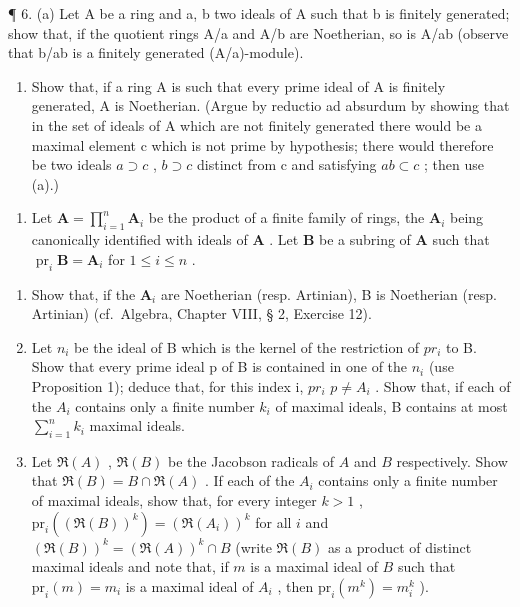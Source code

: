 ¶ 6. (a) Let A be a ring and a, b two ideals of A such that b is finitely generated; show that, if the quotient rings A/a and A/b are Noetherian, so is A/ab (observe that b/ab is a finitely generated (A/a)-module).

\begin{enumerate}
\def\labelenumi{(\alph{enumi})}
\setcounter{enumi}{1}
\tightlist
\item
  Show that, if a ring A is such that every prime ideal of A is finitely generated, A is Noetherian. (Argue by reductio ad absurdum by showing that in the set of ideals of A which are not finitely generated there would be a maximal element c which is not prime by hypothesis; there would therefore be two ideals \(a \supset c\) , \(b \supset c\) distinct from c and satisfying \(ab \subset c\) ; then use (a).)
\end{enumerate}

\begin{enumerate}
\def\labelenumi{\arabic{enumi}.}
\setcounter{enumi}{6}
\tightlist
\item
  Let \(\mathbf{A} = \prod_{i=1}^{n} \mathbf{A}_i\) be the product of a finite family of rings, the \(\mathbf{A}_i\) being canonically identified with ideals of \(\mathbf{A}\) . Let \(\mathbf{B}\) be a subring of \(\mathbf{A}\) such that \(\operatorname{pr}_i \mathbf{B} = \mathbf{A}_i\) for \(1 \leqslant i \leqslant n\) .
\end{enumerate}

\begin{enumerate}
\def\labelenumi{(\alph{enumi})}
\item
  Show that, if the \(\mathbf{A}_i\) are Noetherian (resp. Artinian), B is Noetherian (resp. Artinian) (cf.~Algebra, Chapter VIII, § 2, Exercise 12).
\item
  Let \(n_{i}\) be the ideal of B which is the kernel of the restriction of \(pr_{i}\) to B. Show that every prime ideal p of B is contained in one of the \(n_{i}\) (use Proposition 1); deduce that, for this index i, \(pr_{i}\) \(p \neq A_{i}\) . Show that, if each of the \(A_{i}\) contains only a finite number \(k_{i}\) of maximal ideals, B contains at most \(\sum_{i=1}^{n} k_{i}\) maximal ideals.
\item
  Let \(\Re(A)\) , \(\Re(B)\) be the Jacobson radicals of \(A\) and \(B\) respectively. Show that \(\Re(B) = B \cap \Re(A)\) . If each of the \(A_i\) contains only a finite number of maximal ideals, show that, for every integer \(k > 1\) , \(\mathrm{pr}_i((\Re(B))^k) = (\Re(A_i))^k\) for all \(i\) and \((\Re(B))^k = (\Re(A))^k \cap B\) (write \(\Re(B)\) as a product of distinct maximal ideals and note that, if \(m\) is a maximal ideal of \(B\) such that \(\mathrm{pr}_i(m) = m_i\) is a maximal ideal of \(A_i\) , then \(\mathrm{pr}_i(m^k) = m_i^k\) ).
\end{enumerate}


